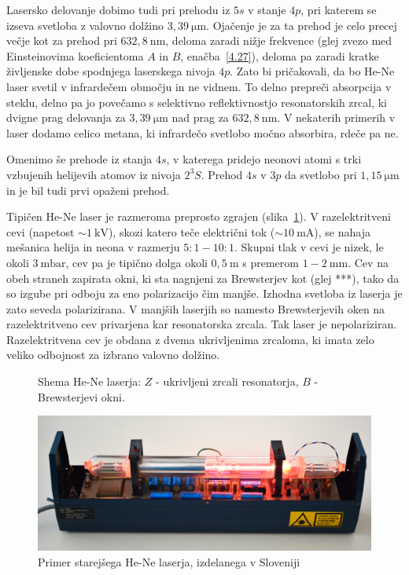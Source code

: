 Lasersko delovanje dobimo tudi pri prehodu iz $5s$ v stanje $4p$, pri katerem 
se izseva svetloba z valovno dolžino $3,39~\si{\micro\metre}$. 
Ojačenje je za ta prehod je celo precej večje kot za
prehod pri $632,8~\si{\nano\metre}$, deloma zaradi nižje frekvence 
(glej zvezo med Einsteinovima koeficientoma $A$ in $B$, enačba~\ref{4.27}), 
deloma pa zaradi kratke življenske dobe spodnjega laserskega nivoja $4p$. 
Zato bi pričakovali, da bo He-Ne laser svetil v infrardečem območju in ne vidnem. 
To delno prepreči absorpcija v steklu, delno pa jo povečamo s selektivno reflektivnostjo
resonatorskih zrcal, ki dvigne prag delovanja za $3,39~\si{\micro\metre}$ 
nad prag za $632,8~\si{\nano\metre}$. V nekaterih primerih v laser dodamo
celico metana, ki infrardečo svetlobo močno absorbira, rdeče pa ne.

Omenimo še prehode iz stanja $4s$, v katerega pridejo neonovi atomi s trki
vzbujenih helijevih atomov iz nivoja $2^3S$. Prehod $4s$ v $3p$ da svetlobo
pri $1,15~\si{\micro\metre}$ in je bil tudi prvi opaženi prehod. 

Tipičen He-Ne laser je razmeroma preprosto zgrajen (slika~\ref{fig:HeNeShema}). 
V razelektritveni cevi (napetost  $\sim 1~\si{\kilo\volt}$), skozi
katero teče električni tok ($\sim 10~\si{\milli\ampere}$), 
se nahaja mešanica helija in neona v razmerju 
$5:1 - 10:1$. Skupni tlak v cevi je nizek, le okoli $3~\si{\milli\bar}$, 
cev pa je tipično dolga okoli $0,5~\si{\metre}$ s premerom $1-2~\si{\milli\metre}$.  
Cev na obeh straneh zapirata okni, ki sta nagnjeni za Brewsterjev kot (glej
***), tako da so izgube pri odboju za eno polarizacijo čim manjše.
Izhodna svetloba iz laserja je zato seveda polarizirana. V manjših laserjih
so namesto Brewsterjevih oken na razelektritveno cev privarjena kar
resonatorska zrcala. Tak laser je nepolariziran. 
Razelektritvena cev je obdana z dvema ukrivljenima zrcaloma, 
ki imata zelo veliko odbojnost za izbrano valovno dolžino.
\begin{figure}[h]
\centering
\def\svgwidth{90truemm} 

\caption{Shema He-Ne laserja: $Z$ - ukrivljeni zrcali resonatorja, $B$ - Brewsterjevi
okni.}
\label{fig:HeNeShema}
\end{figure}

\begin{figure}[h]
\centering
\includegraphics[width=120truemm]{slike/07_HeNe.jpg}
\caption{Primer starejšega He-Ne laserja, izdelanega v Sloveniji}
\label{fig:Iskra}
\end{figure}

